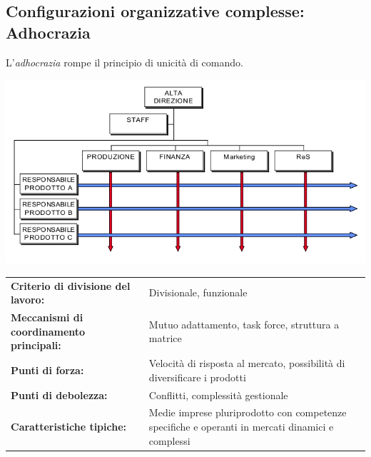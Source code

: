 \subsection{Configurazioni organizzative complesse: Adhocrazia}
L'\emph{adhocrazia} rompe il principio di unicità di comando.
\begin{center}
	\includegraphics[width=0.5\linewidth]{images/adhocrazia}
\end{center}

\begin{tabular}{>{\bfseries}l p{90mm}}
	Criterio di divisione del lavoro: & Divisionale, funzionale\\
	Meccanismi di coordinamento principali: & Mutuo adattamento, task
	force, struttura a matrice
\\
	Punti di forza: & Velocità di risposta al mercato, possibilità di
	diversificare i prodotti
\\
	Punti di debolezza: & Conflitti, complessità gestionale
 \\
	Caratteristiche tipiche: & Medie imprese pluriprodotto con
	competenze specifiche e operanti in mercati dinamici e complessi \\
\end{tabular}

